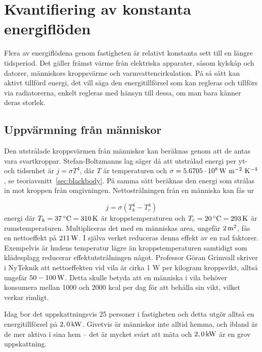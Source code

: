 \section{Kvantifiering av konstanta energiflöden}
\label{sec:constsources}


Flera av energiflödena genom fastigheten är relativt konstanta sett till en längre tidsperiod. Det gäller främst värme från elektriska apparater, såsom kylskåp och datorer, människors kroppsvärme och varmvattencirkulation. På så sätt kan aktivt tillförd energi, det vill säga den energitillförsel som kan regleras och tillförs via radiatorerna, enkelt regleras med hänsyn till dessa, om man bara känner deras storlek.

\subsection{Uppvärmning från människor}
Den utstrålade kroppsvärmen från människor kan beräknas genom att de antas vara svartkroppar. Stefan-Boltzmanns lag säger då att utstrålad energi per yt- och tidsenhet är $j=\sigma T^4$, där $T$ är temperaturen och $\sigma=\unit[5.6705\cdot 10^8]{W~m^{-2}~K^{-4}}$ \cite{physicshandbook}, se teoriavsnitt~\ref{sec:blackbody}. På samma sätt beräknas den energi som strålas in mot kroppen från omgivningen. Nettostrålningen från en människa kan fås ur

\begin{equation}
\label{eq:constantsources:stefan}
j=\sigma \left( T_k^4 - T_r^4 \right)
\end{equation}
\noindent
energi
där $T_k=\unit[37]{^{\circ}C}=\unit[310]{K}$ är kroppstemperaturen och $T_r=\unit[20]{^{\circ}C}=\unit[293]{K}$ är rumstemperaturen. Multipliceras det med en människas area, ungefär $\unit[2]{m^2}$, fås en nettoeffekt på $\unit[211]{W}$. I själva verket reduceras denna effekt av en rad faktorer. Exempelvis är hudens temperatur lägre än kroppstemperaturen samtidigt som klädesplagg reducerar effektutstrålningen något. Professor Göran Grimvall skriver i NyTeknik\cite{Grimvall} att nettoeffekten vid vila är cirka 1 W per kilogram kroppsvikt, alltså ungefär $\unit[50-100]{W}$\cite{Grimvall}. Detta skulle betyda att en människa i vila behöver konsumera mellan 1000 och 2000 kcal per dag för att behålla sin vikt, vilket verkar rimligt.

Idag bor det uppskattningsvis 25 personer i fastigheten och detta utgör alltså en energitillförsel på $\unit[2,0]{kW}$. Givetvis är människor inte alltid hemma, och ibland är de mer aktiva i sina hem – det är mycket svårt att mäta och $\unit[2,0]{kW}$ är en grov uppskattning.

